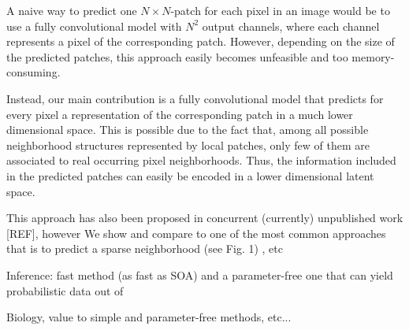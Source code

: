 A naive way to predict one $N\times N$-patch for each pixel in an image would be to use a fully convolutional model with $N^2$ output channels, where each channel represents a pixel of the corresponding patch. However, depending on the size of the predicted patches, this approach easily becomes unfeasible and too memory-consuming.

Instead, our main contribution is a fully convolutional model that predicts for every pixel a representation of the corresponding patch in a much lower dimensional space. This is possible due to the fact that, among all possible neighborhood structures represented by local patches, only few of them are associated to real occurring pixel neighborhoods. Thus, the information included in the predicted patches can easily be encoded in a lower dimensional latent space. 

This approach has also been proposed in concurrent (currently) unpublished work [REF], however 
We show and compare to one of the most common approaches that is to predict a sparse neighborhood (see Fig. 1) \cite{liu2018affinity} \cite{wolf2018mutex}, etc

Inference: fast method (as fast as SOA) and a parameter-free one that can yield probabilistic data out of 

Biology, value to simple and parameter-free methods, etc...



